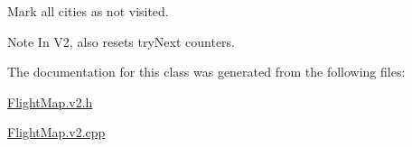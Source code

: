 Mark all cities as not visited. 

\begin{DoxyNote}{Note}
In V2, also resets try\+Next counters. 
\end{DoxyNote}


The documentation for this class was generated from the following files\+:\begin{DoxyCompactItemize}
\item 
\hyperlink{_flight_map_8v2_8h}{Flight\+Map.\+v2.\+h}\item 
\hyperlink{_flight_map_8v2_8cpp}{Flight\+Map.\+v2.\+cpp}\end{DoxyCompactItemize}

